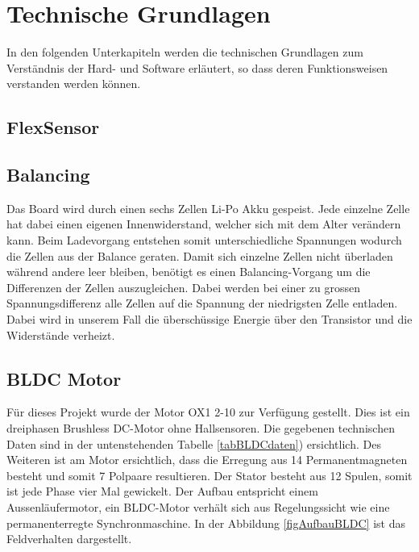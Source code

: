\section{Technische Grundlagen}
In den folgenden Unterkapiteln werden die technischen Grundlagen zum Verständnis der Hard- und Software erläutert, so dass deren Funktionsweisen verstanden werden können.  
\subsection{FlexSensor}
\label{tGl_FlexSensor}

\subsection{Balancing}
\label{tGl_Balancing}
Das Board wird durch einen sechs Zellen Li-Po Akku gespeist. Jede einzelne Zelle hat dabei einen eigenen Innenwiderstand, welcher sich mit dem Alter verändern kann. Beim Ladevorgang entstehen somit unterschiedliche Spannungen wodurch die Zellen aus der Balance geraten.
Damit sich einzelne Zellen nicht überladen während andere leer bleiben, benötigt es einen Balancing-Vorgang um die Differenzen der Zellen auszugleichen. 
Dabei werden bei einer zu grossen Spannungsdifferenz alle Zellen auf die Spannung der niedrigsten Zelle entladen. Dabei wird in unserem Fall die überschüssige Energie über den Transistor und die Widerstände verheizt.

\subsection{BLDC Motor}
\label{tGl_BLDC}

Für dieses Projekt wurde der Motor OX1 2-10 zur Verfügung gestellt. Dies ist ein dreiphasen Brushless DC-Motor ohne Hallsensoren. Die gegebenen technischen Daten sind in der untenstehenden Tabelle \ref{tabBLDCdaten}) ersichtlich. 
Des Weiteren ist am Motor ersichtlich, dass die Erregung aus 14 Permanentmagneten besteht und somit 7 Polpaare resultieren. Der Stator besteht aus 12 Spulen, somit ist jede Phase vier Mal gewickelt.
Der Aufbau entspricht einem Aussenläufermotor, ein BLDC-Motor verhält sich aus Regelungssicht wie eine permanenterregte Synchronmaschine. In der Abbildung \ref{figAufbauBLDC} ist das Feldverhalten dargestellt.\\

